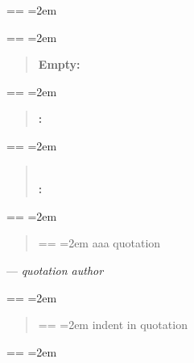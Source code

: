 \documentclass{book}
\makeatletter
\newenvironment{GNUTexinfopreformatted}{%
  \par\obeylines\obeyspaces\frenchspacing
  \parskip=\z@\parindent=\z@}{}
\makeatother
\begin{document}
\begin{GNUTexinfopreformatted}
\leftskip=2em\relax\ttfamily%

\end{GNUTexinfopreformatted}
\begin{quote}
\end{quote}
\begin{GNUTexinfopreformatted}
\leftskip=2em\relax\ttfamily%

\end{GNUTexinfopreformatted}
\begin{quote}
\textbf{Empty:} \end{quote}
\begin{GNUTexinfopreformatted}
\leftskip=2em\relax\ttfamily%

\end{GNUTexinfopreformatted}
\begin{quote}
\textbf{:} \end{quote}
\begin{GNUTexinfopreformatted}
\leftskip=2em\relax\ttfamily%

\end{GNUTexinfopreformatted}
\begin{quote}
\textbf{\leavevmode{}\\:} \end{quote}
\begin{GNUTexinfopreformatted}
\leftskip=2em\relax\ttfamily%

\end{GNUTexinfopreformatted}
\begin{quote}
\begin{GNUTexinfopreformatted}
\leftskip=2em\relax\ttfamily%
aaa quotation
\end{GNUTexinfopreformatted}
\end{quote}
\begin{center}
--- \emph{quotation author}
\end{center}
\begin{GNUTexinfopreformatted}
\leftskip=2em\relax\ttfamily%

\end{GNUTexinfopreformatted}
\begin{quote}
\begin{GNUTexinfopreformatted}
\leftskip=2em\relax\ttfamily%
indent in quotation
\end{GNUTexinfopreformatted}
\end{quote}
\begin{GNUTexinfopreformatted}
\leftskip=2em\relax\ttfamily%

\end{GNUTexinfopreformatted}
\end{document}
